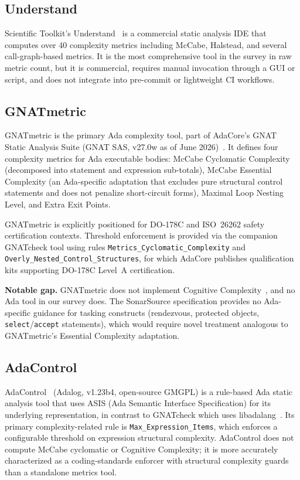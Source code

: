 \documentclass[10pt,twocolumn,letterpaper]{article}
\begin{document}
\subsection{Understand}

Scientific Toolkit's Understand~\cite{understand} is a commercial static
analysis IDE that computes over 40 complexity metrics including McCabe,
Halstead, and several call-graph-based metrics.  It is the most
comprehensive tool in the survey in raw metric count, but it is
commercial, requires manual invocation through a GUI or script, and
does not integrate into pre-commit or lightweight CI workflows.

\subsection{GNATmetric}

GNATmetric is the primary Ada complexity tool, part of AdaCore's GNAT
Static Analysis Suite (GNAT SAS, v27.0w as of June 2026)~\cite{gnatmetric}.
It defines four complexity metrics for Ada executable bodies: McCabe
Cyclomatic Complexity (decomposed into statement and expression sub-totals),
McCabe Essential Complexity (an Ada-specific adaptation that excludes
pure structural control statements and does not penalize short-circuit forms),
Maximal Loop Nesting Level, and Extra Exit Points.

GNATmetric is explicitly positioned for DO-178C and ISO~26262 safety
certification contexts.  Threshold enforcement is provided via the companion
GNATcheck tool using rules \texttt{Metrics\_Cyclomatic\_Complexity} and
\texttt{Overly\_Nested\_Control\_Structures}, for which AdaCore publishes
qualification kits supporting DO-178C Level~A certification.

\textbf{Notable gap.}  GNATmetric does not implement Cognitive
Complexity~\cite{cognitive-complexity}, and no Ada tool in our survey
does.  The SonarSource specification provides no Ada-specific guidance
for tasking constructs (rendezvous, protected objects,
\texttt{select}/\texttt{accept} statements), which would require novel
treatment analogous to GNATmetric's Essential Complexity adaptation.

\subsection{AdaControl}

AdaControl~\cite{adacontrol} (Adalog, v1.23b4, open-source GMGPL) is a
rule-based Ada static analysis tool that uses ASIS (Ada Semantic Interface
Specification) for its underlying representation, in contrast to GNATcheck
which uses libadalang~\cite{adalog-benchmark}.  Its primary
complexity-related rule is \texttt{Max\_Expression\_Items}, which enforces
a configurable threshold on expression structural complexity.  AdaControl
does not compute McCabe cyclomatic or Cognitive Complexity; it is more
accurately characterized as a coding-standards enforcer with structural
complexity guards than a standalone metrics tool.
\end{document}
